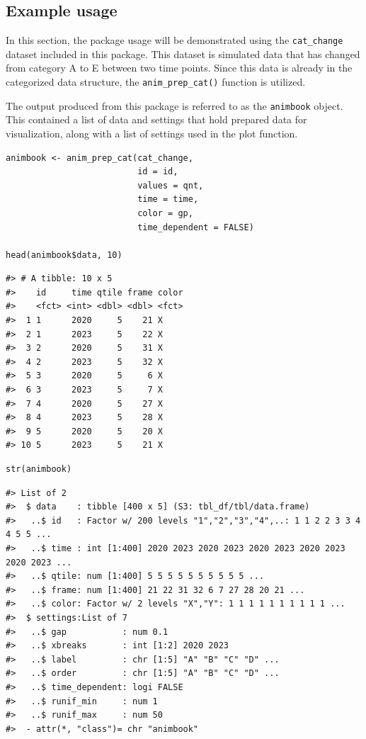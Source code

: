 \hypertarget{example-usage}{%
\subsection{Example usage}\label{example-usage}}

In this section, the package usage will be demonstrated using the \texttt{cat\_change} dataset included in this package. This dataset is simulated data that has changed from category A to E between two time points. Since this data is already in the categorized data structure, the \texttt{anim\_prep\_cat()} function is utilized.

The output produced from this package is referred to as the \texttt{animbook} object. This contained a list of data and settings that hold prepared data for visualization, along with a list of settings used in the plot function.

\begin{verbatim}
animbook <- anim_prep_cat(cat_change, 
                          id = id, 
                          values = qnt, 
                          time = time, 
                          color = gp, 
                          time_dependent = FALSE)

head(animbook$data, 10)
\end{verbatim}

\begin{verbatim}
#> # A tibble: 10 x 5
#>    id     time qtile frame color
#>    <fct> <int> <dbl> <dbl> <fct>
#>  1 1      2020     5    21 X    
#>  2 1      2023     5    22 X    
#>  3 2      2020     5    31 X    
#>  4 2      2023     5    32 X    
#>  5 3      2020     5     6 X    
#>  6 3      2023     5     7 X    
#>  7 4      2020     5    27 X    
#>  8 4      2023     5    28 X    
#>  9 5      2020     5    20 X    
#> 10 5      2023     5    21 X
\end{verbatim}

\begin{verbatim}
str(animbook)
\end{verbatim}

\begin{verbatim}
#> List of 2
#>  $ data    : tibble [400 x 5] (S3: tbl_df/tbl/data.frame)
#>   ..$ id   : Factor w/ 200 levels "1","2","3","4",..: 1 1 2 2 3 3 4 4 5 5 ...
#>   ..$ time : int [1:400] 2020 2023 2020 2023 2020 2023 2020 2023 2020 2023 ...
#>   ..$ qtile: num [1:400] 5 5 5 5 5 5 5 5 5 5 ...
#>   ..$ frame: num [1:400] 21 22 31 32 6 7 27 28 20 21 ...
#>   ..$ color: Factor w/ 2 levels "X","Y": 1 1 1 1 1 1 1 1 1 1 ...
#>  $ settings:List of 7
#>   ..$ gap           : num 0.1
#>   ..$ xbreaks       : int [1:2] 2020 2023
#>   ..$ label         : chr [1:5] "A" "B" "C" "D" ...
#>   ..$ order         : chr [1:5] "A" "B" "C" "D" ...
#>   ..$ time_dependent: logi FALSE
#>   ..$ runif_min     : num 1
#>   ..$ runif_max     : num 50
#>  - attr(*, "class")= chr "animbook"
\end{verbatim}

